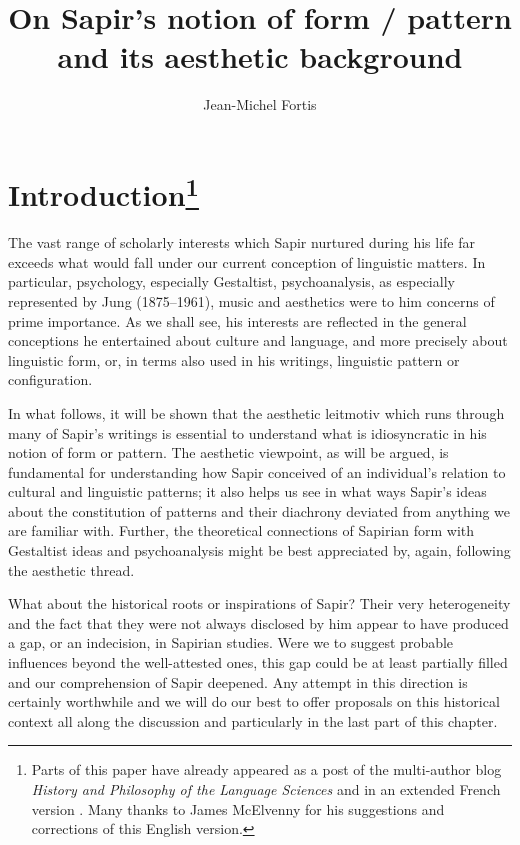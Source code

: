 \documentclass[output=paper]{langscibook}
\author{Jean-Michel Fortis\affiliation{\textsc{cnrs}, Université Paris Diderot}}
\title{On Sapir's notion of form / pattern and its aesthetic background}
\begin{document}
\maketitle

\section{Introduction\protect\footnote{Parts of this paper have already appeared as a post of the multi-author blog \emph{History and Philosophy of the Language Sciences} \citep{Fortis2014} and in an extended French version \citep{Fortis2015}. Many thanks to James McElvenny for his suggestions and corrections of this English version. }}
\label{sec:fotis:intro}

The vast range of scholarly interests which Sapir nurtured during his life far exceeds what would fall under our current conception of linguistic matters. In particular, psychology, especially Gestaltist, psychoanalysis, as especially represented by Jung (1875--1961), music and aesthetics were to him concerns of prime importance. As we shall see, his interests are reflected in the general conceptions he entertained about culture and language, and more precisely about linguistic form, or, in terms also used in his writings, linguistic pattern or configuration.

In what follows, it will be shown that the aesthetic leitmotiv which runs through many of Sapir's writings is essential to understand what is idiosyncratic in his notion of form or pattern. The aesthetic viewpoint, as will be argued, is fundamental for understanding how Sapir conceived of an individual's relation to cultural and linguistic patterns; it also helps us see in what ways Sapir's ideas about the constitution of patterns and their diachrony deviated from anything we are familiar with. Further, the theoretical connections of Sapirian form with Gestaltist ideas and psychoanalysis might be best appreciated by, again, following the aesthetic thread.

What about the historical roots or inspirations of Sapir? Their very heterogeneity and the fact that they were not always disclosed by him appear to have produced a gap, or an indecision, in Sapirian studies. Were we to suggest probable influences beyond the well-attested ones, this gap could be at least partially filled and our comprehension of Sapir deepened. Any attempt in this direction is certainly worthwhile and we will do our best to offer proposals on this historical context all along the discussion and particularly in the last part of this chapter.
\end{document}
